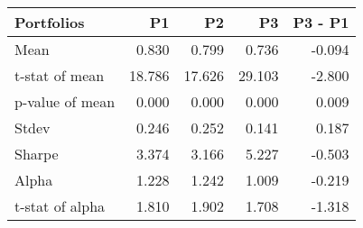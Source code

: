 \begin{tabular}{lrrrr}
\toprule
Portfolios & P1 & P2 & P3 & P3 - P1 \\
\midrule
Mean & 0.830 & 0.799 & 0.736 & -0.094 \\
t-stat of mean & 18.786 & 17.626 & 29.103 & -2.800 \\
p-value of mean & 0.000 & 0.000 & 0.000 & 0.009 \\
Stdev & 0.246 & 0.252 & 0.141 & 0.187 \\
Sharpe & 3.374 & 3.166 & 5.227 & -0.503 \\
Alpha & 1.228 & 1.242 & 1.009 & -0.219 \\
t-stat of alpha & 1.810 & 1.902 & 1.708 & -1.318 \\
\bottomrule
\end{tabular}
